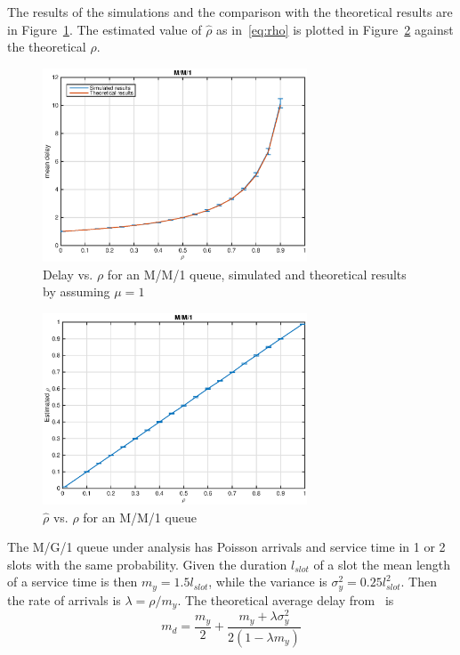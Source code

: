\documentclass[10pt]{article}
\begin{document}
The results of the simulations and the comparison with the theoretical results are in Figure~\ref{fig:mm1_dl}. The estimated value of $\hat{\rho}$ as in~\eqref{eq:rho} is plotted in Figure~\ref{fig:mm1_rho} against the theoretical $\rho$. 

\begin{figure}[h!]
	\centering
	\includegraphics[width = 0.7\textwidth]{mm1_dl}
	\caption{Delay vs. $\rho$ for an M/M/1 queue, simulated and theoretical results by assuming $\mu = 1$}
	\label{fig:mm1_dl}
\end{figure}

\begin{figure}[h!]
	\centering
	\includegraphics[width = 0.7\textwidth]{mm1_rho}
	\caption{$\hat{\rho}$ vs. $\rho$ for an M/M/1 queue}
	\label{fig:mm1_rho}
\end{figure}

The M/G/1 queue under analysis has Poisson arrivals and service time in 1 or 2 slots with the same probability. Given the duration $l_{slot}$ of a slot the mean length of a service time is then $m_y = 1.5 l_{slot}$, while the variance is $\sigma_y^2 = 0.25 l_{slot}^2$. Then the rate of arrivals is $\lambda = \rho/m_y$. The theoretical average delay from~\cite{bz} is
\begin{equation}
	m_d = \frac{m_y}{2} + \frac{m_y + \lambda \sigma_y^2}{2(1- \lambda m_y)}
\end{equation}
\end{document}
